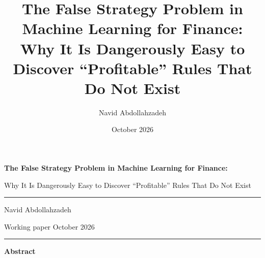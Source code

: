 \documentclass[11pt]{article}
\title{\textbf{The False Strategy Problem in Machine Learning for Finance:}\\[2pt]
\large Why It Is Dangerously Easy to Discover ``Profitable'' Rules That Do Not Exist}
\author{Navid Abdollahzadeh}
\date{October 2026}
\begin{document}
\begin{titlepage}
\thispagestyle{empty}
\vspace*{0.6cm}
\begin{center}
{\LARGE\bfseries The False Strategy Problem in Machine Learning for Finance:\par}
\vspace{6pt}
{\Large Why It Is Dangerously Easy to Discover ``Profitable'' Rules That Do Not Exist\par}
\vspace{18pt}
\rule{0.55\textwidth}{0.4pt}\par
\vspace{14pt}
{\large Navid Abdollahzadeh\par}
\vspace{4pt}
{\normalsize Working paper \textperiodcentered{} October 2026\par}
\vspace{14pt}
\rule{0.55\textwidth}{0.4pt}\par
\end{center}
\vspace{1.2cm}
\begin{center}
\begin{minipage}{0.86\textwidth}
\begin{center}{\bfseries Abstract}\end{center}
\vspace{2pt}
\small

\end{minipage}
\end{center}
\end{titlepage}
\end{document}

